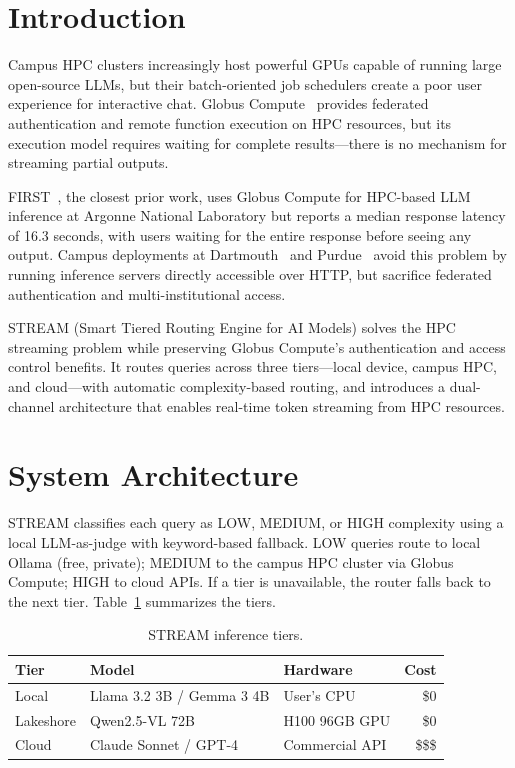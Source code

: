 \documentclass[manuscript, review]{acmart}
\begin{document}
\section{Introduction}

Campus HPC clusters increasingly host powerful GPUs capable of running large open-source LLMs, but their batch-oriented job schedulers create a poor user experience for interactive chat. Globus Compute~\cite{globuscompute2024} provides federated authentication and remote function execution on HPC resources, but its execution model requires waiting for complete results---there is no mechanism for streaming partial outputs.

FIRST~\cite{first2025}, the closest prior work, uses Globus Compute for HPC-based LLM inference at Argonne National Laboratory but reports a median response latency of 16.3 seconds, with users waiting for the entire response before seeing any output. Campus deployments at Dartmouth~\cite{dartmouth2025} and Purdue~\cite{purdue2025} avoid this problem by running inference servers directly accessible over HTTP, but sacrifice federated authentication and multi-institutional access.

STREAM (Smart Tiered Routing Engine for AI Models) solves the HPC streaming problem while preserving Globus Compute's authentication and access control benefits. It routes queries across three tiers---local device, campus HPC, and cloud---with automatic complexity-based routing, and introduces a dual-channel architecture that enables real-time token streaming from HPC resources.


\section{System Architecture}

STREAM classifies each query as LOW, MEDIUM, or HIGH complexity using a local LLM-as-judge with keyword-based fallback. LOW queries route to local Ollama (free, private); MEDIUM to the campus HPC cluster via Globus Compute; HIGH to cloud APIs. If a tier is unavailable, the router falls back to the next tier. Table~\ref{tab:tiers} summarizes the tiers.

\begin{table}[h]
\centering
\caption{STREAM inference tiers.}
\label{tab:tiers}
\small
\begin{tabular}{@{}lllr@{}}
\toprule
\textbf{Tier} & \textbf{Model} & \textbf{Hardware} & \textbf{Cost} \\
\midrule
Local     & Llama 3.2 3B / Gemma 3 4B & User's CPU    & \$0 \\
Lakeshore & Qwen2.5-VL 72B            & H100 96GB GPU & \$0 \\
Cloud     & Claude Sonnet / GPT-4      & Commercial API & \$\$\$ \\
\bottomrule
\end{tabular}
\end{table}
\end{document}

